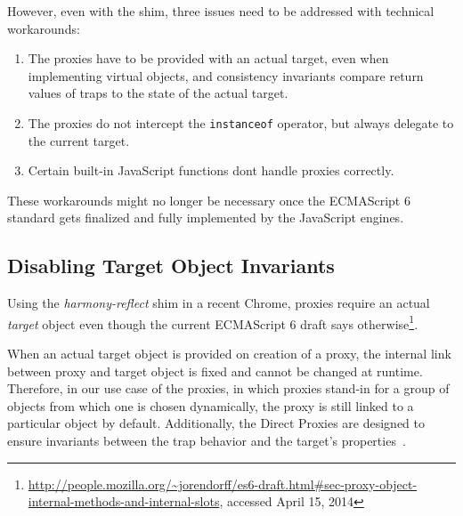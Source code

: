 However, even with the shim, three issues need to be addressed with technical workarounds:

\begin{enumerate}
    \item The proxies have to be provided with an actual target, even when implementing virtual objects, and consistency invariants compare return values of traps to the state of the actual target. 
    \item The proxies do not intercept the \lstinline{instanceof} operator, but always delegate to the current target.
    \item Certain built-in JavaScript functions dont handle proxies correctly.
\end{enumerate}

These workarounds might no longer be necessary once the ECMAScript 6 standard gets finalized and fully implemented by the JavaScript engines. 


\subsection{Disabling Target Object Invariants}



Using the \emph{harmony-reflect} shim in a recent Chrome, proxies require an actual \emph{target} object even though the current ECMAScript 6 draft says otherwise\footnote{\url{http://people.mozilla.org/~jorendorff/es6-draft.html\#sec-proxy-object-internal-methods-and-internal-slots}, accessed April 15, 2014}.

When an actual target object is provided on creation of a proxy, the internal link between proxy and target object is fixed and cannot be changed at runtime.
Therefore, in our use case of the proxies, in which proxies stand-in for a group of objects from which one is chosen dynamically, the proxy is still linked to a particular object by default.
Additionally, the Direct Proxies are designed to ensure invariants between the trap behavior and the target's properties~\cite{Cutsem2013TRP}.

